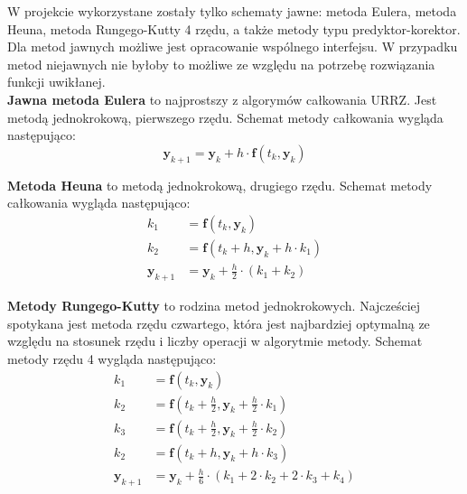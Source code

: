 W projekcie wykorzystane zostały tylko schematy jawne: metoda Eulera, metoda Heuna, metoda Rungego-Kutty 4 rzędu, a także metody typu predyktor-korektor. Dla metod jawnych możliwe jest opracowanie wspólnego interfejsu. W przypadku metod niejawnych nie byłoby to możliwe ze względu na potrzebę rozwiązania funkcji uwikłanej. \\

\textbf{Jawna metoda Eulera} to najprostszy z algorymów całkowania URRZ. Jest metodą jednokrokową, pierwszego rzędu. Schemat metody całkowania wygląda następująco:
\[
	\bm{y}_{k+1} = \bm{y}_{k} + h \cdot  \bm{f} \left( t_{k}, \bm{y}_{k} \right) 
\]

\textbf{Metoda Heuna} to metodą jednokrokową, drugiego rzędu. Schemat metody całkowania wygląda następująco:
\[
	\begin{aligned}
	k_1 & =  \bm{f} \left( t_{k}, \bm{y}_{k} \right)\\
	k_2 & =  \bm{f} \left( t_{k} + h, \bm{y}_{k} +  h \cdot k_1  \right)\\
	\bm{y}_{k+1} & = \bm{y}_{k} + \frac{h}{2} \cdot  \left( k_1 + k_2 \right)
	\end{aligned}
\]

\textbf{Metody Rungego-Kutty} to rodzina metod jednokrokowych. Najcześciej spotykana jest metoda rzędu czwartego, która jest najbardziej optymalną ze względu na stosunek rzędu i liczby operacji w algorytmie metody.  Schemat metody rzędu 4 wygląda następująco:
\[
	\begin{aligned}
	k_1 & =  \bm{f} \left( t_{k}, \bm{y}_{k} \right)\\
	k_2 & =  \bm{f} \left( t_{k} + \frac{h}{2}, \bm{y}_{k} + \frac{h}{2} \cdot k_1 \right)\\
	k_3 & =  \bm{f} \left( t_{k} + \frac{h}{2}, \bm{y}_{k} + \frac{h}{2} \cdot k_2 \right)\\
	k_2 & =  \bm{f} \left( t_{k} + h, \bm{y}_{k} +  h \cdot k_3  \right)\\
	\bm{y}_{k+1} & = \bm{y}_{k} + \frac{h}{6} \cdot  \left( k_1 + 2 \cdot k_2 + 2 \cdot k_3 +k_4 \right)
	\end{aligned}
\]

